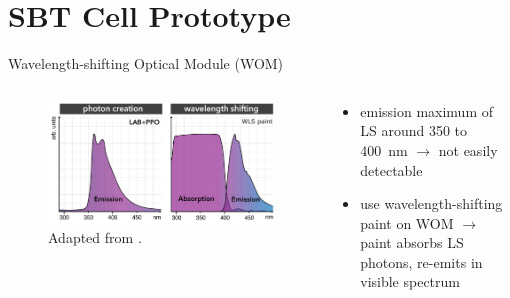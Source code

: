 \documentclass[aspectratio=169]{beamer}
\begin{document}
	
	
	\section{SBT Cell Prototype}
	
	
	
	
	
	\begin{frame}{Wavelength-shifting Optical Module (WOM)}
		\begin{columns}
			\begin{column}{0.5\textwidth}
				\begin{figure}
					\centering
					\includegraphics[width=\textwidth]{pictures/absorption-emission.png}
					\caption{Adapted from \cite{ZIMMERMANN}.}
				\end{figure}
				
			\end{column}
			
			\begin{column}{0.5\textwidth}
				\begin{itemize}
					\item emission maximum of LS around 350 to \SI{400}{\nano\meter} $\rightarrow$ not easily detectable
					\item use wavelength-shifting paint on WOM $\rightarrow$ paint absorbs LS photons, re-emits in visible spectrum
				\end{itemize}
				
			\end{column}
		\end{columns}
	\end{frame}
\end{document}

